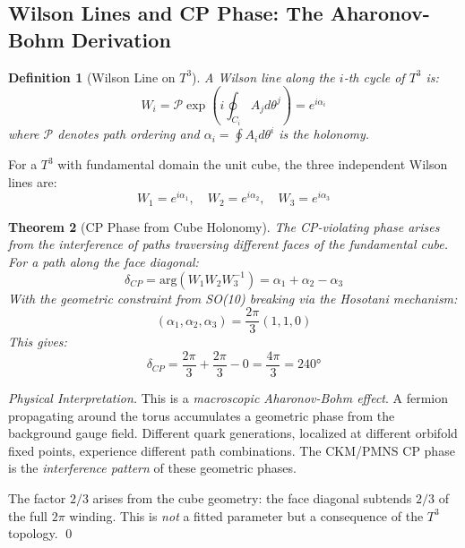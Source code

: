 \documentclass[12pt,a4paper]{article}
\newtheorem{theorem}{Theorem}[section]
\newtheorem{definition}[theorem]{Definition}
\begin{document}
\subsection{Wilson Lines and CP Phase: The Aharonov-Bohm Derivation}

\begin{definition}[Wilson Line on $T^3$]
A Wilson line along the $i$-th cycle of $T^3$ is:
\begin{equation}
W_i = \mathcal{P}\exp\left(i\oint_{C_i} A_j d\theta^j\right) = e^{i\alpha_i}
\end{equation}
where $\mathcal{P}$ denotes path ordering and $\alpha_i = \oint A_i d\theta^i$ is the holonomy.
\end{definition}

For a $T^3$ with fundamental domain the unit cube, the three independent Wilson lines are:
\begin{equation}
W_1 = e^{i\alpha_1}, \quad W_2 = e^{i\alpha_2}, \quad W_3 = e^{i\alpha_3}
\end{equation}

\begin{theorem}[CP Phase from Cube Holonomy]
The CP-violating phase arises from the interference of paths traversing different faces of the fundamental cube. For a path along the face diagonal:
\begin{equation}
\delta_{CP} = \text{arg}\left(W_1 W_2 W_3^{-1}\right) = \alpha_1 + \alpha_2 - \alpha_3
\end{equation}
With the geometric constraint from SO(10) breaking via the Hosotani mechanism:
\begin{equation}
(\alpha_1, \alpha_2, \alpha_3) = \frac{2\pi}{3}(1, 1, 0)
\end{equation}
This gives:
\begin{equation}
\boxed{\delta_{CP} = \frac{2\pi}{3} + \frac{2\pi}{3} - 0 = \frac{4\pi}{3} = 240°}
\end{equation}
\end{theorem}

\begin{proof}[Physical Interpretation]
This is a \textit{macroscopic Aharonov-Bohm effect}. A fermion propagating around the torus accumulates a geometric phase from the background gauge field. Different quark generations, localized at different orbifold fixed points, experience different path combinations. The CKM/PMNS CP phase is the \textit{interference pattern} of these geometric phases.

The factor $2/3$ arises from the cube geometry: the face diagonal subtends $2/3$ of the full $2\pi$ winding. This is \textit{not} a fitted parameter but a consequence of the $T^3$ topology. \qed
\end{proof}
\end{document}
